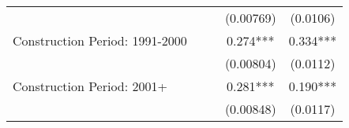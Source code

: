 \documentclass[12pt]{article}
\begin{document}
\begin{table}[H]
\begin{tabular}{lcccc}
                                &            &             & (0.00769)   & (0.0106)     \\
Construction Period: 1991-2000                       &            &             & 0.274***    & 0.334***     \\
                                &            &             & (0.00804)   & (0.0112)     \\
Construction Period: 2001+                           &            &             & 0.281***    & 0.190***     \\
                                &            &             & (0.00848)   & (0.0117)     \\
 \hline

    \end{tabular}%


  \label{tab:addlabel}%
\end{table}%
\end{document}
